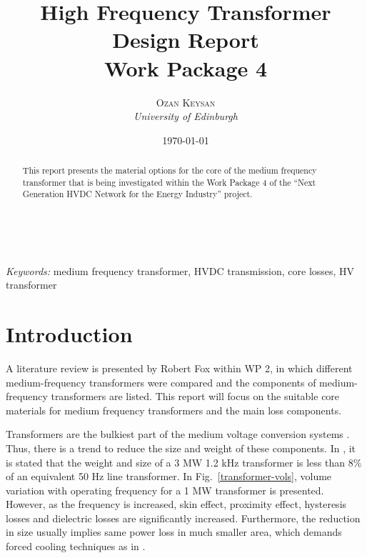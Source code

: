 \documentclass[a4paper, 11pt]{article} %
\title{\textbf{High Frequency Transformer Design Report}\\ %
Work Package 4} %
\author{\textsc{Ozan Keysan} %
\\{\textit{University of Edinburgh}}} %
\date{\today} %
\makeatletter
\renewcommand{\maketitle}{ %
\begin{flushright} %
{\LARGE\@title} %

\vspace{50pt} %

{\large\@author} %
\\\@date %

\vspace{40pt} %
\end{flushright}
}
\makeatother
\begin{document}
\maketitle %



\begin{abstract}
This report presents the material options for the core of the medium frequency transformer that is being investigated within the Work Package 4 of the ``Next Generation HVDC Network for the   Energy Industry'' project. 
\end{abstract}

\hspace*{3,6mm}\textit{Keywords:} medium frequency transformer, HVDC transmission, core losses, HV transformer %

\vspace{30pt} %


\section{Introduction}


A literature review is presented by Robert Fox within WP 2, in which different medium-frequency transformers were compared and the components of medium-frequency transformers are listed. This report will focus on the suitable core materials for medium frequency transformers and the main loss components.

Transformers are the bulkiest part of the medium voltage conversion systems \cite{Agheb2012, Steiner2007}. Thus, there is a trend to reduce the size and weight of these components. In \cite{Prasai2007}, it is stated that the weight and size of a 3 MW 1.2 kHz transformer is less than 8\% of an equivalent 50 Hz line transformer. In Fig.~\ref{transformer-vols}, volume variation with operating frequency for a 1 MW transformer is presented. However, as the frequency is increased, skin effect, proximity effect, hysteresis losses and dielectric losses are significantly increased. Furthermore, the reduction in size usually implies same power loss in much smaller area, which demands forced cooling techniques as in \cite{Heinemann2002}.
\end{document}
